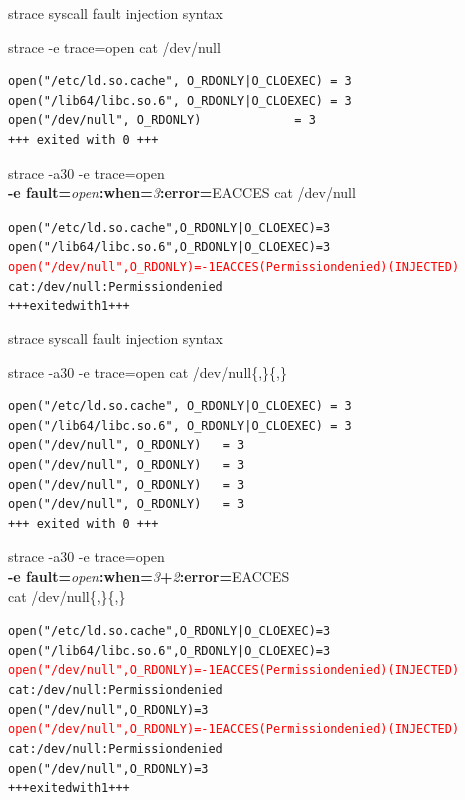 \documentclass[unicode]{beamer}
\begin{document}
\begin{frame}[fragile]{strace syscall fault injection syntax}
\scriptsize
\begin{block}{\large strace -e trace=open cat /dev/null}
\begin{verbatim}
open("/etc/ld.so.cache", O_RDONLY|O_CLOEXEC) = 3
open("/lib64/libc.so.6", O_RDONLY|O_CLOEXEC) = 3
open("/dev/null", O_RDONLY)             = 3
+++ exited with 0 +++
\end{verbatim}
\end{block}
\begin{block}{\large strace -a30 -e trace=open \\ {\bf -e fault=}{\it open}{\bf :when=}{\it 3}{\bf :error=}{\sc EACCES} cat /dev/null}
\begin{alltt}
open("/etc/ld.so.cache", O_RDONLY|O_CLOEXEC) = 3
open("/lib64/libc.so.6", O_RDONLY|O_CLOEXEC) = 3
\textcolor{red}{open("/dev/null", O_RDONLY)   = -1 EACCES (Permission denied) (INJECTED)}
cat: /dev/null: Permission denied
+++ exited with 1 +++
\end{alltt}
\end{block}
\end{frame}

\begin{frame}[fragile]{strace syscall fault injection syntax}
\scriptsize
\begin{block}{\large strace -a30 -e trace=open cat /dev/null\{,\}\{,\}}
\begin{verbatim}
open("/etc/ld.so.cache", O_RDONLY|O_CLOEXEC) = 3
open("/lib64/libc.so.6", O_RDONLY|O_CLOEXEC) = 3
open("/dev/null", O_RDONLY)   = 3
open("/dev/null", O_RDONLY)   = 3
open("/dev/null", O_RDONLY)   = 3
open("/dev/null", O_RDONLY)   = 3
+++ exited with 0 +++
\end{verbatim}
\end{block}
\begin{block}{\large strace -a30 -e trace=open \\ {\bf -e fault=}{\it open}{\bf :when=}{\it 3}{\bf +}{\it 2}{\bf :error=}{\sc EACCES} \\ cat /dev/null\{,\}\{,\}}
\begin{alltt}
open("/etc/ld.so.cache", O_RDONLY|O_CLOEXEC) = 3
open("/lib64/libc.so.6", O_RDONLY|O_CLOEXEC) = 3
\textcolor{red}{open("/dev/null", O_RDONLY)   = -1 EACCES (Permission denied) (INJECTED)}
cat: /dev/null: Permission denied
open("/dev/null", O_RDONLY)   = 3
\textcolor{red}{open("/dev/null", O_RDONLY)   = -1 EACCES (Permission denied) (INJECTED)}
cat: /dev/null: Permission denied
open("/dev/null", O_RDONLY)   = 3
+++ exited with 1 +++
\end{alltt}
\end{block}
\end{frame}
\end{document}
